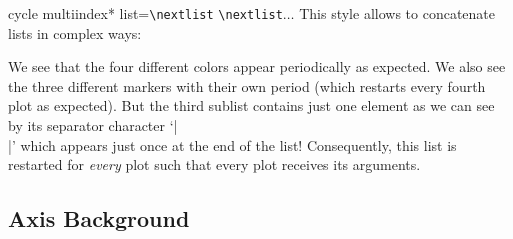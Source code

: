 \begin{pgfplotskey}{%
    cycle multiindex* list=\texttt{\textbackslash nextlist}%
    \texttt{\textbackslash nextlist}$\ldots$
}
    This style allows to concatenate lists in complex ways:
\begin{codeexample}[]
\end{codeexample}
    We see that the four different colors appear periodically as expected. We
    also see the three different markers with their own period (which restarts
    every fourth plot as expected). But the third sublist contains just one
    element as we can see by its separator character `|\\|' which appears just
    once at the end of the list! Consequently, this list is restarted for
    \emph{every} plot such that every plot receives its arguments.
\end{pgfplotskey}


\subsection{Axis Background}

